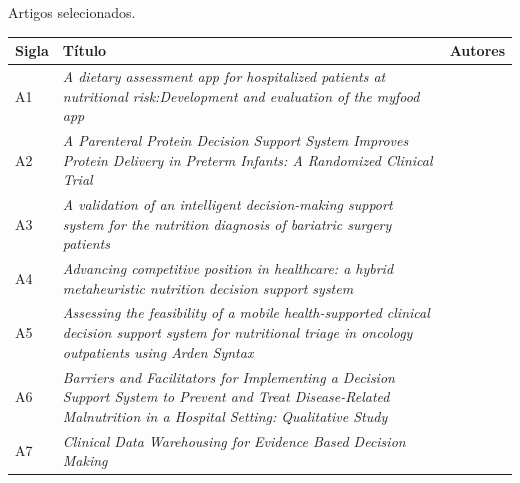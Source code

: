 \begin{quadro}[htb]
\caption{\label{quadro_artigosSelecionados}Artigos selecionados.}
\label{}
\begin{tabular}{|p{}|p{7cm}|p{5cm}|}
	\hline
	\textbf{Sigla} & \textbf{Título} & \textbf{Autores} \\ \hline
	A1  & \textit{A dietary assessment app for hospitalized patients at nutritional risk:Development and evaluation of the myfood app} & \cite{paulsen2018_1} \\ \hline
	A2  & \textit{A Parenteral Protein Decision Support System Improves Protein Delivery in Preterm Infants: A Randomized Clinical Trial} & \cite{alrifai2017} \\ \hline
	A3  & \textit{A validation of an intelligent decision-making support system for the nutrition diagnosis of bariatric surgery patients} & \cite{cruz2017} \\ \hline
	A4  & \textit{Advancing competitive position in healthcare: a hybrid metaheuristic nutrition decision support system} & \cite{ileri2019} \\ \hline
	A5  & \textit{Assessing the feasibility of a mobile health-supported clinical decision support system for nutritional triage in oncology outpatients using Arden Syntax} & \cite{bruin2018} \\ \hline
	A6  & \textit{Barriers and Facilitators for Implementing a Decision Support System to Prevent and Treat Disease-Related Malnutrition in a Hospital Setting: Qualitative Study} & \cite{paulsen2018_2} \\ \hline
	A7  & \textit{Clinical Data Warehousing for Evidence Based Decision Making} & \cite{narra2015} \\ \hline
\end{tabular}
\end{quadro} 

